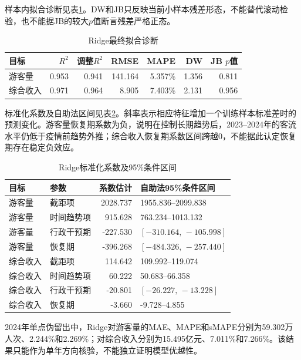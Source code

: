 \documentclass[withoutpreface,bwprint]{cumcmthesis}
\begin{document}
样本内拟合诊断见表\ref{tab:q2_diagnostics}。DW和JB只反映当前小样本残差形态，不能替代滚动检验，也不能据JB的较大$p$值断言残差严格正态。

\begin{table}[H]
\centering
\caption{Ridge最终拟合诊断}
\label{tab:q2_diagnostics}
\small
\renewcommand{\arraystretch}{1.08}
\begin{tabular}{lrrrrrr}
\toprule
目标 & $R^2$ & 调整$R^2$ & RMSE & MAPE & DW & JB $p$值 \\
\midrule
游客量 & 0.953 & 0.941 & 141.164 & 5.357\% & 1.356 & 0.811 \\
综合收入 & 0.971 & 0.964 & 8.905 & 7.403\% & 2.131 & 0.956 \\
\bottomrule
\end{tabular}
\end{table}

标准化系数及自助法区间见表\ref{tab:q2_coefficients}。斜率表示相应特征增加一个训练样本标准差时的预测变化。游客量恢复期系数为负，说明在控制长期趋势后，2023--2024年的客流水平仍低于疫情前趋势外推；综合收入恢复期系数区间跨越0，不能据此认定恢复期存在稳定负效应。

\begin{table}[H]
\centering
\caption{Ridge标准化系数及95\%条件区间}
\label{tab:q2_coefficients}
\small
\renewcommand{\arraystretch}{1.08}
\begin{tabularx}{\textwidth}{p{2.6cm}p{3.0cm}rX}
\toprule
目标 & 参数 & 系数估计 & 自助法95\%条件区间 \\
\midrule
游客量 & 截距项 & 2028.737 & 1955.836--2099.838 \\
游客量 & 时间趋势项 & 915.628 & 763.234--1013.132 \\
游客量 & 行政干预期 & -227.530 & $[-310.164,\,-105.998]$ \\
游客量 & 恢复期 & -396.268 & $[-484.326,\,-257.440]$ \\
综合收入 & 截距项 & 114.642 & 109.992--119.074 \\
综合收入 & 时间趋势项 & 60.222 & 50.683--66.358 \\
综合收入 & 行政干预期 & -20.801 & $[-26.227,\,-13.228]$ \\
综合收入 & 恢复期 & -3.660 & -9.728--4.855 \\
\bottomrule
\end{tabularx}
\end{table}

2024年单点伪留出中，Ridge对游客量的MAE、MAPE和sMAPE分别为59.302万人次、2.244\%和2.269\%；对综合收入分别为15.495亿元、7.011\%和7.266\%。该结果只能作为单年方向核验，不能独立证明模型优越性。
\end{document}
